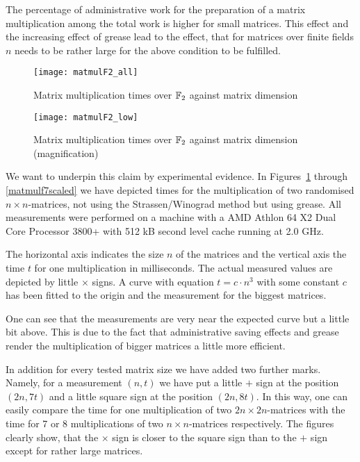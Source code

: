 The percentage of administrative work for the preparation of a matrix
multiplication among the total work is higher for small matrices.
This effect and the increasing
effect of grease lead to the
effect, that for matrices over finite fields $n$ needs to be rather large
for the above condition to be fulfilled. 

\begin{figure}[ht]
\begin{center}
\texttt{[image: matmulF2\_all]}
\end{center}
\caption{Matrix multiplication times over $\mathbb{F}_2$ against matrix dimension}
\label{matmulf2}
\end{figure}

\begin{figure}[ht]
\begin{center}
\texttt{[image: matmulF2\_low]}
\end{center}
\caption{Matrix multiplication times over $\mathbb{F}_2$ against matrix dimension
(magnification)}
\label{matmulf2scaled}
\end{figure}

We want to underpin this claim by experimental evidence. In
Figures~\ref{matmulf2} through \ref{matmulf7scaled} we have depicted times
for the multiplication of two randomised $n\times n$-matrices, not
using the Strassen/Winograd method but using grease.
All measurements were performed on a machine with a AMD Athlon 64 X2 
Dual Core Processor 3800+ with 512 kB second level cache running at 2.0 GHz.

The horizontal axis indicates the size $n$ of the matrices and the vertical
axis the time $t$ for one multiplication in milliseconds. 
The actual measured values are depicted by
little $\times$ signs. A curve with equation $t=c \cdot n^3$ with some constant
$c$ has been fitted to the origin and the measurement for the biggest 
matrices. 

One can see that the measurements are very near the expected
curve but a little bit above. This is due to the fact that administrative
saving effects and grease render the multiplication
of bigger matrices a little more efficient. 

In addition for every tested matrix size we have added two further marks.
Namely, for a measurement $(n,t)$ we have put a little $+$ sign at the
position $(2n,7t)$ and a little square sign at the position $(2n,8t)$.
In this way, one can easily compare the time for one multiplication of two
$2n \times 2n$-matrices with the time for 7 or 8 multiplications of two
$n \times n$-matrices respectively. The figures clearly show, that the $\times$
sign is closer to the square sign than to the $+$ sign except for rather
large matrices.

